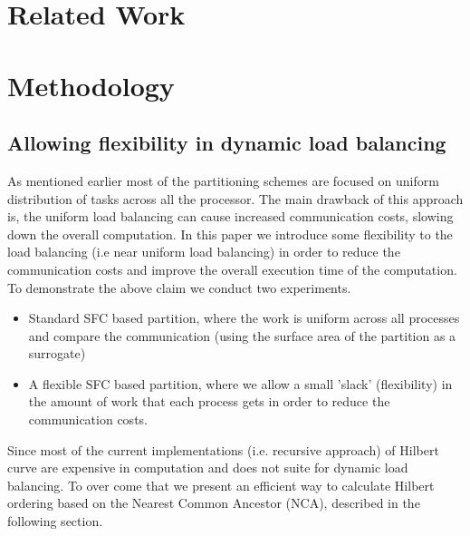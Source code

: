 \documentclass[a4paper,10pt]{article}
\begin{document}
\section{Related Work}

\section{Methodology}

\subsection{Allowing flexibility in dynamic load balancing}

As mentioned earlier most of the partitioning schemes are focused on uniform distribution of tasks across all the processor. The main drawback of this approach is, the uniform load balancing can cause
increased communication costs, slowing down the overall computation. In this paper we introduce some flexibility to the load balancing (i.e near uniform load balancing) in order to reduce the communication
costs and improve the overall execution time of the computation. To demonstrate the above claim we conduct two experiments.
\begin{itemize}
 \item Standard SFC based partition, where the work is uniform across all processes and compare the communication (using the surface area of the partition as a surrogate)
 \item A flexible SFC based partition, where we allow a small 'slack' (flexibility) in the amount of work that each process gets in order to reduce the communication costs. 
\end{itemize}

Since most of the current implementations (i.e. recursive approach) of Hilbert curve are expensive in computation and does not suite for dynamic load balancing. To over come that we present an efficient
way to calculate Hilbert ordering based on the Nearest Common Ancestor (NCA), described in the following section. 
\end{document}
